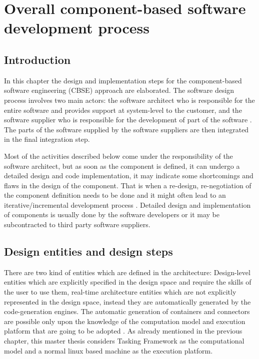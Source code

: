 
\chapter{Overall component-based software development process}
\label{chap: Software development process}
\section{Introduction}
In this chapter the design and implementation steps for the component-based software engineering (CBSE) approach are elaborated. The software design process involves two main actors: the software architect who is responsible for the entire software and provides support at system-level to the customer, and the software supplier who is responsible for the development of part of the software \cite{CompBasedProcess}. The parts of the software supplied by the software suppliers are then integrated in the final integration step.

Most of the activities described below come under the responsibility of the software architect, but as soon as the component is defined, it can undergo a detailed design and code implementation, it may indicate some shortcomings and flaws in the design of the component. That is when a re-design, re-negotiation of the component definition needs to be done and it might often lead to an iterative/incremental development process \cite{ScheduAnaly}. Detailed design and implementation of components is usually done by the software developers or it may be subcontracted to third party software suppliers. 

\section{Design entities and design steps}
There are two kind of entities which are defined in the architecture: Design-level entities which are explicitly specified in the design space and require the skills of the user to use them, real-time architecture entities which are not explicitly represented in the design space, instead they are automatically generated by the code-generation engines. The automatic generation of containers and connectors are possible only upon the knowledge of the computation model and execution platform that are going to be adopted \cite{SAVOIR}\cite{CompBasedProcess}. As already mentioned in the previous chapter, this master thesis considers Tasking Framework as the computational model and a normal linux based machine as the execution platform.   

